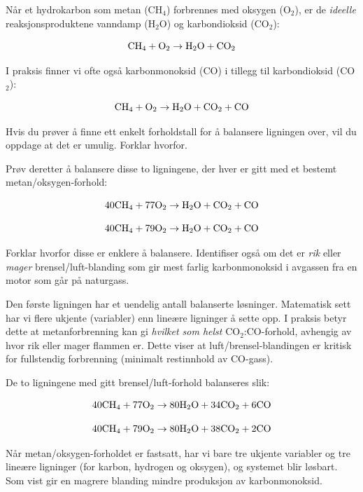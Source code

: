 

Når et hydrokarbon som metan (CH$_{4}$) forbrennes med oksygen (O$_{2}$), er de {\it ideelle} reaksjonsproduktene vanndamp (H$_{2}$O) og karbondioksid (CO$_{2}$):

$$\hbox{CH}_4 + \hbox{O}_2 \to \hbox{H}_2\hbox{O} + \hbox{CO}_2$$

I praksis finner vi ofte også karbonmonoksid (CO) i tillegg til karbondioksid (CO$_{2}$):

$$\hbox{CH}_4 + \hbox{O}_2 \to \hbox{H}_2\hbox{O} + \hbox{CO}_2 + \hbox{CO}$$

Hvis du prøver å finne ett enkelt forholdstall for å balansere ligningen over, vil du oppdage at det er umulig. Forklar hvorfor.

\vskip 10pt

Prøv deretter å balansere disse to ligningene, der hver er gitt med et bestemt metan/oksygen-forhold:

$$40\hbox{CH}_4 + 77\hbox{O}_2 \to \hbox{H}_2\hbox{O} + \hbox{CO}_2 + \hbox{CO}$$

$$40\hbox{CH}_4 + 79\hbox{O}_2 \to \hbox{H}_2\hbox{O} + \hbox{CO}_2 + \hbox{CO}$$

Forklar hvorfor disse er enklere å balansere. Identifiser også om det er {\it rik} eller {\it mager} brensel/luft-blanding som gir mest farlig karbonmonoksid i avgassen fra en motor som går på naturgass.







Den første ligningen har et uendelig antall balanserte løsninger. Matematisk sett har vi flere ukjente (variabler) enn lineære ligninger å sette opp. I praksis betyr dette at metanforbrenning kan gi {\it hvilket som helst} CO$_{2}$:CO-forhold, avhengig av hvor rik eller mager flammen er. Dette viser at luft/brensel-blandingen er kritisk for fullstendig forbrenning (minimalt restinnhold av CO-gass).

\vskip 10pt

De to ligningene med gitt brensel/luft-forhold balanseres slik:

$$40\hbox{CH}_4 + 77\hbox{O}_2 \to 80\hbox{H}_2\hbox{O} + 34\hbox{CO}_2 + 6\hbox{CO}$$

$$40\hbox{CH}_4 + 79\hbox{O}_2 \to 80\hbox{H}_2\hbox{O} + 38\hbox{CO}_2 + 2\hbox{CO}$$

Når metan/oksygen-forholdet er fastsatt, har vi bare tre ukjente variabler og tre lineære ligninger (for karbon, hydrogen og oksygen), og systemet blir løsbart. Som vist gir en magrere blanding mindre produksjon av karbonmonoksid.









